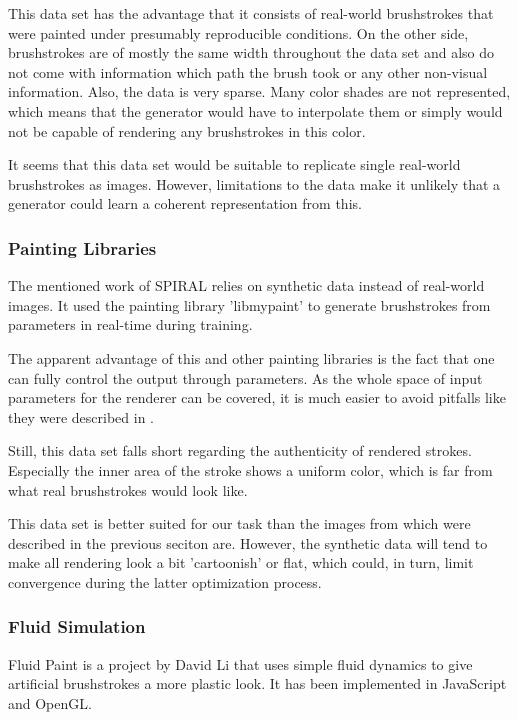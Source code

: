 This data set has the advantage that it consists of real-world brushstrokes that were painted under presumably reproducible conditions.
On the other side, brushstrokes are of mostly the same width throughout the data set and also do not come with information which path the brush took or any other non-visual information.
Also, the data is very sparse.
Many color shades are not represented, which means that the generator would have to interpolate them or simply would not be capable of rendering any brushstrokes in this color.

It seems that this data set would be suitable to replicate single real-world brushstrokes as images.
However, limitations to the data make it unlikely that a generator could learn a coherent representation from this.

\subsubsection{Painting Libraries}

The mentioned work of SPIRAL \cite{SPIRAL} relies on synthetic data instead of real-world images.
It used the painting library 'libmypaint' \cite{libmypaint} to generate brushstrokes from parameters in real-time during training.

The apparent advantage of this and other painting libraries is the fact that one can fully control the output through parameters.
As the whole space of input parameters for the renderer can be covered, it is much easier to avoid pitfalls like they were described in .

Still, this data set falls short regarding the authenticity of rendered strokes.
Especially the inner area of the stroke shows a uniform color, which is far from what real brushstrokes would look like.

This data set is better suited for our task than the images from which were described in the previous seciton are.
However, the synthetic data will tend to make all rendering look a bit 'cartoonish' or flat, which could, in turn, limit convergence during the latter optimization process.

\subsubsection{Fluid Simulation}

Fluid Paint is a project by David Li \cite{fluidpaint} that uses simple
fluid dynamics to give artificial brushstrokes a more plastic look.
It has been implemented in JavaScript and OpenGL.

